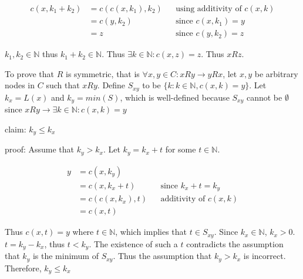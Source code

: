\documentclass[11pt]{article}
\begin{document}
    \begin{align*}
        \text{$c(x,k_{1}+k_{2})$} &= \text{$c(c(x,k_{1}),k_{2})$} && \text{using additivity of $c(x,k)$} \\
        &= \text{$c(y,k_{2})$} && \text{since $c(x,k_{1})=y$} \\
        &= \text{$z$} && \text{since $c(y,k_{2})=z$}
    \end{align*}

    $k_{1}, k_{2} \in \mathbb{N}$ thus $k_{1}+k_{2} \in \mathbb{N}$. Thus $\exists k \in \mathbb{N}: c(x,z) = z$. Thus $xRz$.

    To prove that $R$ is symmetric, that is $\forall x,y \in C: xRy \rightarrow yRx$, let $x,y$ be arbitrary nodes in $C$ such that $xRy$. Define $S_{xy}$ to be $\{k: k \in \mathbb{N}, c(x,k) = y\}$. Let $k_{x} = L(x)$ and $k_{y} = min(S)$, which is well-defined because $S_{xy}$ cannot be $\emptyset$ since $xRy \rightarrow \exists k \in \mathbb{N}: c(x,k) = y$

    claim: $k_{y} \leq k_{x}$

    proof:
    Assume that $k_{y} > k_{x}$. Let $k_{y} = k_{x} + t$ for some $t \in \mathbb{N}$.

    \begin{align*}
        \text{$y$} &= \text{$c(x,k_{y})$} && \text{} \\
        &= \text{$c(x,k_{x}+t)$} && \text{since $k_{x}+t=k_{y}$} \\
        &= \text{$c(c(x,k_{x}),t)$} && \text{additivity of $c(x,k)$} \\
        &= \text{$c(x,t)$} && \text{}
    \end{align*}

    Thus $c(x,t)=y$ where $t\in\mathbb{N}$, which implies that $t\in S_{xy}$. Since $k_{x}\in\mathbb{N}$, $k_{x}>0$. $t=k_{y}-k_{x}$, thus $t<k_{y}$. The existence of such a $t$ contradicts the assumption that $k_{y}$ is the minimum of $S_{xy}$. Thus the assumption that $k_{y}>k_{x}$ is incorrect. Therefore, $k_{y} \leq k_{x}$

    \iffalse
    c(x,kx) = c(x,(kx-ky)+ky) = c(c(x,ky),kx-ky) = c(y,kx-ky)
    c(x,kx)=x
    thus c(y,kx-ky) = x

    Let k0 be some N such that c(y,k0) = y
    k0 is guaranteed to exist since yed(y)
    kx-ky>=0
    kx-ky+k0>0
    c(y,kx-ky+k0) = c(c(y,k0),kx-ky) = c(y,kx-ky) = x
    Let k1 = kx-ky+k0
    k1 e N and c(y,k1)=x
    thus x e d(y)
    thus xRy implies yRx
    \fi
\end{document}
